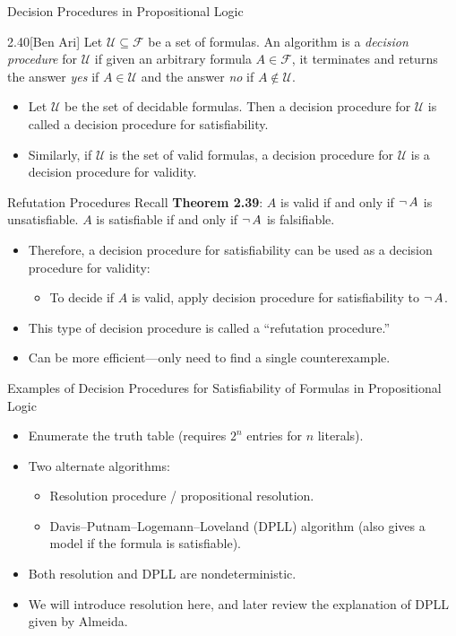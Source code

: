 \documentclass[style=sailor,size=12pt]{powerdot}
\begin{document}
\begin{wideslide}[bm=,toc=]{Decision Procedures in Propositional Logic}
\begin{defn}{2.40}[Ben Ari]
Let $\mathcal{U} \subseteq \mathcal{F}$ be a set of formulas. An algorithm
is a \emph{decision procedure} for $\mathcal{U}$ if given an arbitrary formula
$A \in \mathcal{F}$, it terminates and returns the answer \emph{yes} if
$A \in \mathcal{U}$ and the answer \emph{no} if $A \notin \mathcal{U}$.
\end{defn}
\begin{itemize}
\item Let $\mathcal{U}$ be the set of decidable formulas. Then a decision
procedure for $\mathcal{U}$ is called a decision procedure for satisfiability.
\item Similarly, if $\mathcal{U}$ is the set of valid formulas, a decision
procedure for $\mathcal{U}$ is a decision procedure for validity. 
\end{itemize} 
\end{wideslide}

\begin{wideslide}[bm=,toc=]{Refutation Procedures}
Recall \textbf{Theorem 2.39}: $A$ is valid if and only if $\mathop{\neg} A$ is unsatisfiable.
$A$ is satisfiable if and only if $\mathop{\neg} A$ is falsifiable.
\begin{itemize}
\item Therefore, a decision procedure for satisfiability can be used as a
decision procedure for validity: 
\begin{itemize}
\item To decide if $A$ is valid, apply decision procedure for satisfiability to $\mathop{\neg} A$. 
\end{itemize} 
\item This type of decision procedure is called a ``refutation procedure.'' 
\item Can be more efficient---only need to find a single counterexample.
\end{itemize} 
\end{wideslide}

\begin{wideslide}[bm=,toc=]{Examples of Decision Procedures for Satisfiability
  of Formulas in Propositional Logic}
\begin{itemize}
\item Enumerate the truth table (requires $2^n$ entries for $n$ literals).
\item Two alternate algorithms:
\begin{itemize}
\item Resolution procedure / propositional resolution.
\item Davis--Putnam--Logemann--Loveland (DPLL) algorithm (also gives a model if
    the formula is satisfiable).
\end{itemize} 
\item Both resolution and DPLL are nondeterministic. 
\item We will introduce resolution here, and later review the explanation of DPLL
given by Almeida.
\end{itemize} 

\end{wideslide}
\end{document}
